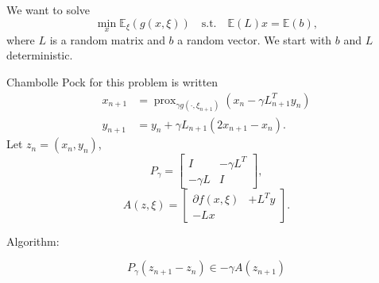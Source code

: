 \documentclass{article}
\DeclareMathOperator{\prox}{prox}
\newcommand{\bE}{{\mathbb E}}
\theoremstyle{definition}
\begin{document}
We want to solve 
\begin{equation}
    \min_x \bE_\xi(g(x,\xi)) \quad\text{s.t.}\quad \bE(L)x = \bE(b),
\end{equation}
where $L$ is a random matrix and $b$ a random vector. We start with $b$ and $L$ deterministic. 

Chambolle Pock for this problem is written
\begin{align}
    x_{n+1} &= \prox_{\gamma g(\cdot,\xi_{n+1})}(x_n - \gamma L_{n+1}^T y_n)\\
    y_{n+1} &= y_n + \gamma L_{n+1}(2 x_{n+1} - x_n).
\end{align}
Let $z_n = (x_n, y_n)$, 
\[
P_\gamma = \begin{bmatrix} I &  -\gamma L^T \\ -\gamma L & I \end{bmatrix},
\]
\[
A(z,\xi) = \begin{bmatrix} \partial f(x,\xi)&  + L^T y \\ -L x& \end{bmatrix} .
\]

Algorithm:

$$
P_\gamma(z_{n+1} - z_n) \in -\gamma A(z_{n+1}) 
$$
\end{document}
